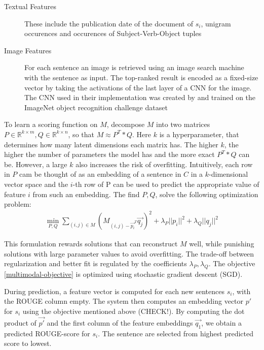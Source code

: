 \documentclass[a4paper,BCOR=10mm]{report}
\begin{document}
\begin{description}
\item[Textual Features]{These include the publication date of the document of $s_i$, unigram occurences and occurences of Subject-Verb-Object tuples}
\item[Image Features]{For each sentence an image is retrieved using an image search machine with the sentence as input. The top-ranked result is encoded as a fixed-size vector by taking the activations of the last layer of a CNN for the image. The CNN used in their implementation was created by \citet{Simonyan and Zisserman} and trained on the ImageNet \citep{ImageNet} object recognition challenge dataset}
\end{description}

To learn a scoring function on $M$, \citet{multimodal} decompose $M$ into two matrices $P \in \mathbb{R}^{k \times m}, Q \in \mathbb{R}^{k \times n}$, so that $M \approx P^T * Q$. Here $k$ is a hyperparameter, that determines how many latent dimensions each matrix has. The higher $k$, the higher the number of parameters the model has and the more exact $P^T * Q$ can be. However, a large $k$ also increases the risk of overfitting. Intuitively, each row in $P$ cam be thought of as an embedding of a sentence in $C$ in a $k$-dimensional vector space and the $i$-th row of P can be used to predict the appropriate value of feature $i$ from such an embedding.
The find $P, Q$, \citeauthor{multimodal} solve the following optimization problem:
\begin{align}
\min_{P, Q} \sum_{(i,j) \in M} (M_{(i,j) - \vec{p_i}^T}\vec{q_j})^2 + \lambda_P ||p_i|| ^ 2 + \lambda_Q ||q_j|| ^ 2 \label{multimodal-objective}
\end{align}

This formulation rewards solutions that can reconstruct $M$ well, while punishing solutions with large parameter values to avoid overfitting. The trade-off between regularization and better fit is regulated by the coefficients $\lambda_P, \lambda_Q$.
The objective \ref{multimodal-objective} is optimized using stochastic gradient descent (SGD).

During prediction, a feature vector is computed for each new sentences $s_i$, with the ROUGE column empty. The system then computes an embedding vector $p'$ for $s_i$ using the objective mentioned above (CHECK!). By computing the dot product of $\vec{p'}$ and the first column of the feature embeddings $\vec{q_1}$, we obtain a predicted ROUGE-score for $s_i$.
The sentence are selected from highest predicted score to lowest.
\end{document}
